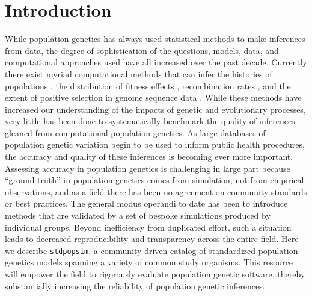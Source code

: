 \documentclass[12pt,halfline,a4paper]{ouparticle}
\newcommand{\stdpopsim}{\texttt{stdpopsim}\xspace}
\begin{document}
\section*{Introduction}
While population genetics has always used statistical methods to make inferences from data,
the degree of sophistication of the questions, models, data, and computational approaches
used have all increased over the past decade. Currently there exist myriad computational methods
that can infer the histories of populations
\citep{gutenkunst2009inferring,li2011inference,excoffier2013robust,schiffels2014inferring, terhorst2017robust,ragsdale2019models},
the distribution of fitness effects \citep{Boyko:2008cr,kim2017inference,tataru2017inference,Fortier703918,Huang2019,Vecchyo770966},
recombination rates \citep{chan2012genome,lin2013fast,Adrion662247,Barroso2019},
and the extent of positive selection in genome sequence data
\citep{eyre2009estimating, alachiotis2012omegaplus,degiorgio2016sweepfinder2,kern2018diplos,sugden2018localization}.
While these methods have increased our understanding of the
impacts of genetic and evolutionary processes, very little has been done to systematically
benchmark the quality of inferences gleaned from computational population genetics.
As large databases of population genetic variation begin to be used to inform public health procedures,
the accuracy and quality of these inferences is becoming ever more important.
Assessing accuracy in population genetics is challenging in large part because
 ``ground-truth'' in population genetics comes from simulation,
not from empirical observations, and as a field there has been no agreement
on community standards or best practices. The general modus operandi to date has been to
introduce methods that are validated by a set of bespoke simulations produced by individual
groups. Beyond inefficiency from duplicated effort, such a situation leads
to decreased reproducibility and transparency across the entire field.
Here we describe \stdpopsim, a community-driven catalog
of standardized population genetics models spanning a variety of common study organisms.
This resource will empower the field to rigorously evaluate population genetic software,
thereby substantially increasing the reliability of population genetic inferences.
\end{document}
